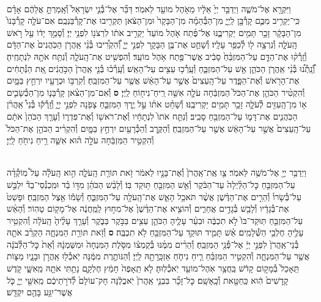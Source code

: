 \documentclass[twoside, openany, parskip=half, 11pt]{book}
\begin{document}
\begin{footnotesize}
\begin{multicols}{2}
\\
וַיִּקְרָ֖א אֶל־מֹשֶׁ֑ה וַיְדַבֵּ֤ר יְיָ֙ אֵלָ֔יו מֵאֹ֥הֶל מוֹעֵ֖ד לֵאמֹֽר׃ דַּבֵּ֞ר אֶל־בְּ֯נֵ֤י יִשְׂרָאֵל֙ וְ֯אָֽמַרְתָּ֣ אֲלֵהֶ֔ם אָדָ֗ם כִּֽי־יַקְרִ֥יב מִכֶּ֛ם קָרְ֯בָּ֖ן לַֽיְיָ֑ מִן־הַבְּ֯הֵמָ֗ה מִן־הַבָּקָר֙ וּמִן־הַצֹּ֔אן תַּקְרִ֖יבוּ אֶת־קָרְ֯בַּנְכֶֽם׃ אִם־עֹלָ֤ה קָרְ֯בָּנוֹ֙ מִן־הַבָּקָ֔ר זָכָ֥ר תָּמִ֖ים יַקְרִיבֶ֑נּוּ אֶל־פֶּ֜תַח אֹ֤הֶל מוֹעֵד֙ יַקְרִ֣יב אֹת֔וֹ לִרְצֹנ֖וֹ לִפְנֵ֥י יְיָ׃
וְ֯סָמַ֣ךְ יָד֔וֹ עַ֖ל רֹ֣אשׁ הָֽעֹלָ֑ה וְ֯נִרְצָ֥ה ל֖וֹ לְ֯כַפֵּ֥ר עָלָֽיו׃
וְ֯שָׁחַ֛ט אֶת־בֶּ֥ן הַבָּקָ֖ר לִפְנֵ֣י יְיָ֑ וְ֯֠הִקְרִ֠יבוּ בְּ֯נֵ֨י אַֽהֲרֹ֤ן הַכֹּֽהֲנִים֙ אֶת־הַדָּ֔ם וְ֯זָֽרְ֯ק֨וּ אֶת־הַדָּ֤ם עַל־הַמִּזְבֵּ֨חַ֙ סָבִ֔יב אֲשֶׁר־פֶּ֖תַח אֹ֥הֶל מוֹעֵֽד׃ וְ֯הִפְשִׁ֖יט אֶת־הָֽעֹלָ֑ה וְ֯נִתַּ֥ח אֹתָ֖הּ לִנְתָחֶֽיהָ׃ וְ֯֠נָֽתְ֯נ֠וּ בְּ֯נֵ֨י אַֽהֲרֹ֧ן הַכֹּהֵ֛ן אֵ֖שׁ עַל־הַמִּזְבֵּ֑חַ וְ֯עָֽרְ֯כ֥וּ עֵצִ֖ים עַל־הָאֵֽשׁ׃ וְ֯עָֽרְ֯כ֗וּ בְּ֯נֵ֤י אַֽהֲרֹן֙ הַכֹּ֣הֲנִ֔ים אֵ֚ת הַנְּ֯תָחִ֔ים אֶת־הָרֹ֖אשׁ וְ֯אֶת־הַפָּ֑דֶר עַל־הָֽעֵצִים֙ אֲשֶׁ֣ר עַל־הָאֵ֔שׁ אֲשֶׁ֖ר עַל־הַמִּזְבֵּֽחַ׃ וְ֯קִרְבּ֥וֹ וּכְרָעָ֖יו יִרְחַ֣ץ בַּמָּ֑יִם וְ֯הִקְטִ֨יר הַכֹּהֵ֤ן אֶת־הַכֹּל֙ הַמִּזְבֵּ֔חָה עֹלָ֛ה אִשֵּׁ֥ה רֵֽיחַ־נִיח֖וֹחַ לַֽיְיָ׃ \textbf{ס}  וְ֯אִם־מִן־הַצֹּ֨אן קָרְ֯בָּנ֧וֹ מִן־הַכְּ֯שָׂבִ֛ים א֥וֹ מִן־הָֽעִזִּ֖ים לְ֯עֹלָ֑ה זָכָ֥ר תָּמִ֖ים יַקְרִיבֶֽנּוּ׃ וְ֯שָׁחַ֨ט אֹת֜וֹ עַ֣ל יֶ֧רֶךְ הַמִּזְבֵּ֛חַ צָפֹ֖נָה לִפְנֵ֣י יְיָ֑ וְ֯זָֽרְ֯ק֡וּ בְּ֯נֵי֩ אַֽהֲרֹ֨ן הַכֹּֽהֲנִ֧ים אֶת־דָּמ֛וֹ עַל־הַמִּזְבֵּ֖חַ סָבִֽיב׃ וְ֯נִתַּ֤ח אֹתוֹ֙ לִנְתָחָ֔יו וְ֯אֶת־רֹאשׁ֖וֹ וְ֯אֶת־פִּדְר֑וֹ וְ֯עָרַ֤ךְ הַכֹּהֵן֙ אֹתָ֔ם עַל־הָֽעֵצִים֙ אֲשֶׁ֣ר עַל־הָאֵ֔שׁ אֲשֶׁ֖ר עַל־הַמִּזְבֵּֽחַ׃ וְ֯הַקֶּ֥רֶב וְ֯הַכְּ֯רָעַ֖יִם יִרְחַ֣ץ בַּמָּ֑יִם וְ֯הִקְרִ֨יב הַכֹּהֵ֤ן אֶת־הַכֹּל֙ וְ֯הִקְטִ֣יר הַמִּזְבֵּ֔חָה עֹלָ֣ה ה֗וּא אִשֵּׁ֛ה רֵ֥יחַ נִיחֹ֖חַ לַֽיְיָ׃

\\
וַיְדַבֵּ֥ר יְיָ֖ אֶל־מֹשֶׁ֥ה לֵּאמֹֽר׃ צַ֤ו אֶֽת־אַֽהֲרֹן֙ וְ֯אֶת־בָּנָ֣יו לֵאמֹ֔ר זֹ֥את תּוֹרַ֖ת הָֽעֹלָ֑ה הִ֣וא הָֽעֹלָ֡ה עַל֩ מֽוֹקְ֯דָ֨ה עַל־הַמִּזְבֵּ֤חַ כׇּל־הַלַּ֨יְלָה֙ עַד־הַבֹּ֔קֶר וְ֯אֵ֥שׁ הַמִּזְבֵּ֖חַ תּ֥וּקַד בּֽוֹ׃ וְ֯לָבַ֨שׁ הַכֹּהֵ֜ן מִדּ֣וֹ בַ֗ד וּמִֽכְנְ֯סֵי־בַד֘ יִלְבַּ֣שׁ עַל־בְּ֯שָׂרוֹ֒ וְ֯הֵרִ֣ים אֶת־הַדֶּ֗שֶׁן אֲשֶׁ֨ר תֹּאכַ֥ל הָאֵ֛שׁ אֶת־הָֽעֹלָ֖ה עַל־הַמִּזְבֵּ֑חַ וְ֯שָׂמ֕וֹ אֵ֖צֶל הַמִּזְבֵּֽחַ׃  וּפָשַׁט֙ אֶת־בְּ֯גָדָ֔יו וְ֯לָבַ֖שׁ בְּ֯גָדִ֣ים אֲחֵרִ֑ים וְ֯הוֹצִ֤יא אֶת־הַדֶּ֨שֶׁן֙ אֶל־מִח֣וּץ לַֽמַּֽחֲנֶ֔ה אֶל־מָק֖וֹם טָהֽוֹר׃ וְ֯הָאֵ֨שׁ עַל־הַמִּזְבֵּ֤חַ תּֽוּקַד־בּוֹ֙ לֹ֣א תִכְבֶּ֔ה וּבִעֵ֨ר עָלֶ֧יהָ הַכֹּהֵ֛ן עֵצִ֖ים בַּבֹּ֣קֶר בַּבֹּ֑קֶר וְ֯עָרַ֤ךְ עָלֶ֨יהָ֙ הָֽעֹלָ֔ה וְ֯הִקְטִ֥יר עָלֶ֖יהָ חֶלְבֵ֥י הַשְּׁ֯לָמִֽים׃ אֵ֗שׁ תָּמִ֛יד תּוּקַ֥ד עַל־הַמִּזְבֵּ֖חַ לֹ֥א תִכְבֶּֽה׃ \textbf{ס}  וְ֯זֹ֥את תּוֹרַ֖ת הַמִּנְחָ֑ה הַקְרֵ֨ב אֹתָ֤הּ בְּ֯נֵי־אַֽהֲרֹן֙ לִפְנֵ֣י יְיָ֔ אֶל־פְּ֯נֵ֖י הַמִּזְבֵּֽחַ׃ וְ֯הֵרִ֨ים מִמֶּ֜נּוּ בְּ֯קֻמְצ֗וֹ מִסֹּ֤לֶת הַמִּנְחָה֙ וּמִשַּׁמְנָ֔הּ וְ֯אֵת֙ כׇּל־הַלְּ֯בֹנָ֔ה אֲשֶׁ֖ר עַל־הַמִּנְחָ֑ה וְ֯הִקְטִ֣יר הַמִּזְבֵּ֗חַ רֵ֧יחַ נִיחֹ֛חַ אַזְכָּֽרָתָ֖הּ לַֽיְיָ׃ וְ֯הַנּוֹתֶ֣רֶת מִמֶּ֔נָּה יֹֽאכְ֯ל֖וּ אַֽהֲרֹ֣ן וּבָנָ֑יו מַצּ֤וֹת תֵּֽאָכֵל֙ בְּ֯מָק֣וֹם קָדֹ֔שׁ בַּֽחֲצַ֥ר אֹֽהֶל־מוֹעֵ֖ד יֹֽאכְ֯לֽוּהָ׃ לֹ֤א תֵֽאָפֶה֙ חָמֵ֔ץ חֶלְקָ֛ם נָתַ֥תִּי אֹתָ֖הּ מֵֽאִשָּׁ֑י קֹ֤דֶשׁ קָֽדָשִׁים֙ הִ֔וא כַּֽחַטָּ֖את וְ֯כָֽאָשָֽׁם׃ כׇּל־זָכָ֞ר בִּבְנֵ֤י אַֽהֲרֹן֙ יֹֽאכֲלֶ֔נָּה חָק־עוֹלָם֙ לְ֯דֹרֹ֣תֵיכֶ֔ם מֵֽאִשֵּׁ֖י יְיָ֑ כֹּ֛ל אֲשֶׁר־יִגַּ֥ע בָּהֶ֖ם יִקְדָּֽשׁ׃


\end{multicols}
\end{footnotesize}
\end{document}
